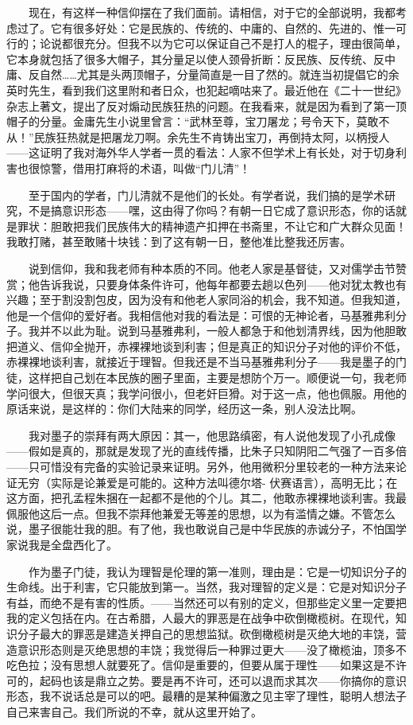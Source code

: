 　　现在，有这样一种信仰摆在了我们面前。请相信，对于它的全部说明，我都考虑过了。它有很多好处：它是民族的、传统的、中庸的、自然的、先进的、惟一可行的；论说都很充分。但我不以为它可以保证自己不是打人的棍子，理由很简单，它本身就包括了很多大帽子，其分量足以使人颈骨折断：反民族、反传统、反中庸、反自然……尤其是头两顶帽子，分量简直是一目了然的。就连当初提倡它的余英时先生，看到我们这里附和者日众，也犯起嘀咕来了。最近他在《二十一世纪》杂志上著文，提出了反对煽动民族狂热的问题。在我看来，就是因为看到了第一顶帽子的分量。金庸先生小说里曾言：“武林至尊，宝刀屠龙；号令天下，莫敢不从！”民族狂热就是把屠龙刀啊。余先生不肯铸出宝刀，再倒持太阿，以柄授人——这证明了我对海外华人学者一贯的看法：人家不但学术上有长处，对于切身利害也很惊警，借用打麻将的术语，叫做“门儿清”！ 

　　至于国内的学者，门儿清就不是他们的长处。有学者说，我们搞的是学术研究，不是搞意识形态——嘿，这由得了你吗？有朝一日它成了意识形态，你的话就是罪状：胆敢把我们民族伟大的精神遗产扣押在书斋里，不让它和广大群众见面！我敢打赌，甚至敢赌十块钱：到了这有朝一日，整他准比整我还厉害。 

　　说到信仰，我和我老师有种本质的不同。他老人家是基督徒，又对儒学击节赞赏；他告诉我说，只要身体条件许可，他每年都要去趟以色列——他对犹太教也有兴趣；至于割没割包皮，因为没有和他老人家同浴的机会，我不知道。但我知道，他是一个信仰的爱好者。我相信他对我的看法是：可恨的无神论者，马基雅弗利分子。我并不以此为耻。说到马基雅弗利，一般人都急于和他划清界线，因为他胆敢把道义、信仰全抛开，赤裸裸地谈到利害；但是真正的知识分子对他的评价不低，赤裸裸地谈利害，就接近于理智。但我还是不当马基雅弗利分子——我是墨子的门徒，这样把自己划在本民族的圈子里面，主要是想防个万一。顺便说一句，我老师学问很大，但很天真；我学问很小，但老奸巨猾。对于这一点，他也佩服。用他的原话来说，是这样的：你们大陆来的同学，经历这一条，别人没法比啊。 

　　我对墨子的崇拜有两大原因：其一，他思路缜密，有人说他发现了小孔成像——假如是真的，那就是发现了光的直线传播，比朱子只知阴阳二气强了一百多倍 ——只可惜没有完备的实验记录来证明。另外，他用微积分里较老的一种方法来论证无穷（实际是论兼爱是可能的。这种方法叫德尔塔- 伏赛语言），高明无比；在这方面，把孔孟程朱捆在一起都不是他的个儿。其二，他敢赤裸裸地谈利害。我最佩服他这后一点。但我不崇拜他兼爱无等差的思想，以为有滥情之嫌。不管怎么说，墨子很能壮我的胆。有了他，我也敢说自己是中华民族的赤诚分子，不怕国学家说我是全盘西化了。 

　　作为墨子门徒，我认为理智是伦理的第一准则，理由是：它是一切知识分子的生命线。出于利害，它只能放到第一。当然，我对理智的定义是：它是对知识分子有益，而绝不是有害的性质。——当然还可以有别的定义，但那些定义里一定要把我的定义包括在内。在古希腊，人最大的罪恶是在战争中砍倒橄榄树。在现代，知识分子最大的罪恶是建造关押自己的思想监狱。砍倒橄榄树是灭绝大地的丰饶，营造意识形态则是灭绝思想的丰饶；我觉得后一种罪过更大——没了橄榄油，顶多不吃色拉；没有思想人就要死了。信仰是重要的，但要从属于理性——如果这是不许可的，起码也该是鼎立之势。要是再不许可，还可以退而求其次——你搞你的意识形态，我不说话总是可以的吧。最糟的是某种偏激之见主宰了理性，聪明人想法子自己来害自己。我们所说的不幸，就从这里开始了。 

